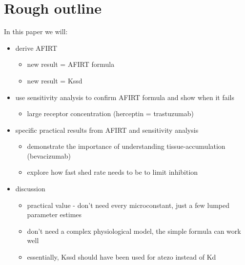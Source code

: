 \section{Rough outline}

In this paper we will:
\begin{itemize}
\item derive AFIRT
	\begin{itemize}
		\item new result = AFIRT formula
		\item new result = Kssd
	\end{itemize}
\item use sensitivity analysis to confirm AFIRT formula and show when it fails
	\begin{itemize}
		\item large receptor concentration (herceptin = trastuzumab)
	\end{itemize}
\item specific practical results from AFIRT and sensitivity analysis
	\begin{itemize}
		\item demonstrate the importance of understanding tissue-accumulation (bevacizumab)
		\item explore how fast shed rate needs to be to limit inhibition
	\end{itemize}
\item discussion
	\begin{itemize}
		\item practical value - don't need every microconstant, just a few lumped parameter estimes
		\item don't need a complex physiological model, the simple formula can work well
		\item essentially, Kssd should have been used for atezo instead of Kd
	\end{itemize}
\end{itemize}



